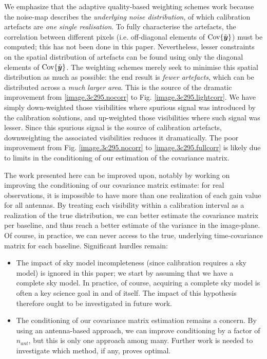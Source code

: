 \pg
We emphasize that the adaptive quality-based weighting schemes work because the noise-{map} describes the \emph{underlying noise distribution}, of which calibration artefacts are \emph{one single realisation}. To fully characterise the artefacts, the correlation between different pixels (i.e. off-diagonal elements of $\textrm{Cov}\{\tilde{\bm{{{y}}}}\}$) must be computed; this has not been done in this paper. Nevertheless, lesser constraints on the spatial distribution of artefacts can be found using only the diagonal elements of $\textrm{Cov}\{\tilde{\bm{{{y}}}}\}$. The weighting schemes merely seek to {minimise} this spatial distribution as much as possible: the end result is \emph{fewer artefacts}, {which can be} distributed across a \emph{much larger area}. {This} is the source of the dramatic improvement from \ref{image.3c295.nocorr} to Fig. \ref{image.3c295.lightcorr}. We have simply down-weighted those visibilities where spurious signal was introduced by the calibration solutions, and up-weighted those visibilities where such signal was lesser. Since this spurious signal is the source of calibration artefacts, downweighting the associated visibilities reduces it dramatically. {The poor improvement from Fig. \ref{image.3c295.nocorr} to \ref{image.3c295.fullcorr}  is likely due to limits in the conditioning of our estimation of the covariance matrix.}

\pg
The work presented here can be improved upon, notably by working on improving the conditioning of our covariance matrix estimate: {for real observations}, it is impossible to have more than one realization of each gain value for all antennas. By treating each visibility within a calibration {interval} as a realization of the true distribution, we can better estimate the covariance matrix per baseline, and thus reach a better estimate of the variance in the image-plane. Of course, in practice, we can never access to the true, underlying time-covariance matrix for each baseline. Significant hurdles remain:
\begin{itemize}
\item The impact of sky model incompleteness (since calibration requires a sky model) is ignored in this paper; we start by assuming that we have a complete sky model. In practice, of course, acquiring a complete sky model is often a key science goal in and of itself. The impact of this hypothesis therefore ought to be investigated in future work.
\item The conditioning of our covariance matrix estimation remains a concern. By using an antenna-based approach, we can improve conditioning by a factor of $n_{ant}$, but this is only one approach among many. Further work is needed to investigate which method, if any, proves optimal.
\end{itemize}